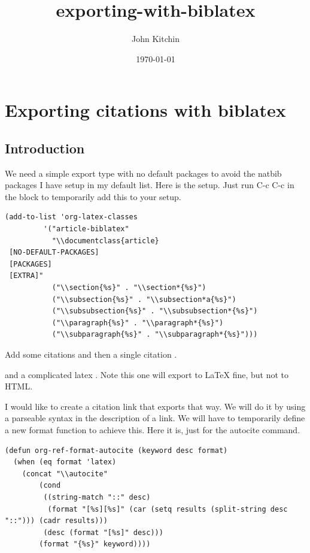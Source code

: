 \documentclass{article}
\author{John Kitchin}
\date{\today}
\title{exporting-with-biblatex}
\begin{document}
\tableofcontents

\section{Exporting citations with biblatex}
\label{sec-1}


\subsection{Introduction}
\label{sec-1-1}
We need a simple export type with no default packages to avoid the natbib packages I have setup in my default list. Here is the setup. Just run C-c C-c in the block to temporarily add this to your setup.

\begin{verbatim}
(add-to-list 'org-latex-classes
	     '("article-biblatex"                         
	       "\\documentclass{article}
 [NO-DEFAULT-PACKAGES]
 [PACKAGES]
 [EXTRA]"        
	       ("\\section{%s}" . "\\section*{%s}")
	       ("\\subsection{%s}" . "\\subsection*a{%s}")
	       ("\\subsubsection{%s}" . "\\subsubsection*{%s}")
	       ("\\paragraph{%s}" . "\\paragraph*{%s}")
	       ("\\subparagraph{%s}" . "\\subparagraph*{%s}")))
\end{verbatim}

Add some citations \autocites{andriotis-2014-infor}{armiento-2014-high}{biskup-2014-insul-ferrom-films}{chemelewski-2014-amorp-feooh}{chen-2014-inter-effec}
 and then a single citation \cite{chen-2014-inter-effec}.

and a complicated latex \cite[pre text][post text]{chen-2014-inter-effec}. Note this one will export to \LaTeX{} fine, but not to HTML.

I would like to create a citation link that exports that way. We will do it by using a parseable syntax in the description of a link. We will have to temporarily define a new format function to achieve this. Here it is, just for the autocite command.

\begin{verbatim}
(defun org-ref-format-autocite (keyword desc format)
  (when (eq format 'latex)
    (concat "\\autocite"
	    (cond
	     ((string-match "::" desc)
	      (format "[%s][%s]" (car (setq results (split-string desc "::"))) (cadr results)))
	     (desc (format "[%s]" desc)))
	    (format "{%s}" keyword))))
\end{verbatim}
\end{document}
